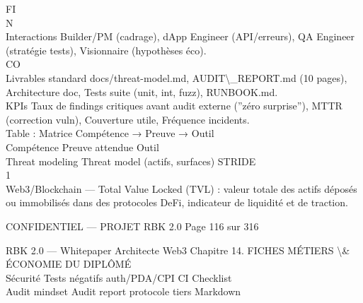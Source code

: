 \vspace{0.5em}
\vspace{0.5em}
\vspace{0.5em}
\vspace{0.5em}
FI\\
N\\
Interactions Builder/PM (cadrage), dApp Engineer (API/erreurs), QA Engineer (stratégie tests), Visionnaire (hypothèses éco).\\
CO\\
Livrables standard          docs/threat-model.md, AUDIT\textbackslash{}_REPORT.md (10 pages), Architecture doc, Tests suite (unit, int, fuzz), RUNBOOK.md.\\
\vspace{0.5em}
\vspace{0.5em}
KPIs Taux de findings critiques avant audit externe (”zéro surprise”), MTTR (correction vuln), Couverture utile, Fréquence incidents.\\
\vspace{0.5em}
Table : Matrice Compétence → Preuve → Outil\\
\vspace{0.5em}
Compétence      Preuve attendue                 Outil\\
Threat modeling Threat model (actifs, surfaces) STRIDE\\
\vspace{0.5em}
\vspace{0.5em}
1\\
Web3/Blockchain — Total Value Locked (TVL) : valeur totale des actifs déposés ou immobilisés dans des protocoles DeFi, indicateur de liquidité et de traction.\\
\vspace{0.5em}
\vspace{0.5em}
\begin{confidential}CONFIDENTIEL — PROJET RBK 2.0                                            Page 116 sur 316\end{confidential}
RBK 2.0 — Whitepaper Architecte Web3                                                         Chapitre 14. FICHES MÉTIERS \textbackslash{}& ÉCONOMIE DU DIPLÔMÉ\\
\vspace{0.5em}
\vspace{0.5em}
\vspace{0.5em}
Sécurité          Tests négatifs auth/PDA/CPI       CI Checklist\\
Audit mindset     Audit report protocole tiers      Markdown\\
